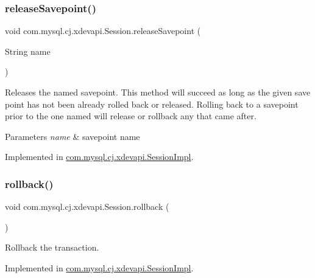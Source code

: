 \subsubsection{\texorpdfstring{release\+Savepoint()}{releaseSavepoint()}}
{\footnotesize\ttfamily void com.\+mysql.\+cj.\+xdevapi.\+Session.\+release\+Savepoint (\begin{DoxyParamCaption}\item[{String}]{name }\end{DoxyParamCaption})}

Releases the named savepoint. This method will succeed as long as the given save point has not been already rolled back or released. Rolling back to a savepoint prior to the one named will release or rollback any that came after.


\begin{DoxyParams}{Parameters}
{\em name} & savepoint name \\
\hline
\end{DoxyParams}


Implemented in \mbox{\hyperlink{classcom_1_1mysql_1_1cj_1_1xdevapi_1_1_session_impl_a8bf42a1928a6bb71f3047e072b9210b4}{com.\+mysql.\+cj.\+xdevapi.\+Session\+Impl}}.

\mbox{\label{interfacecom_1_1mysql_1_1cj_1_1xdevapi_1_1_session_a7c850a35b858307dd253bac93a187e8b}} 
\subsubsection{\texorpdfstring{rollback()}{rollback()}}
{\footnotesize\ttfamily void com.\+mysql.\+cj.\+xdevapi.\+Session.\+rollback (\begin{DoxyParamCaption}{ }\end{DoxyParamCaption})}

Rollback the transaction. 

Implemented in \mbox{\hyperlink{classcom_1_1mysql_1_1cj_1_1xdevapi_1_1_session_impl_a7c11c5d1f54f7a1f6ad2c0891dd59a67}{com.\+mysql.\+cj.\+xdevapi.\+Session\+Impl}}.

\mbox{\label{interfacecom_1_1mysql_1_1cj_1_1xdevapi_1_1_session_a31dc4b454a765a159c591d5cc4f3d1cc}} 
